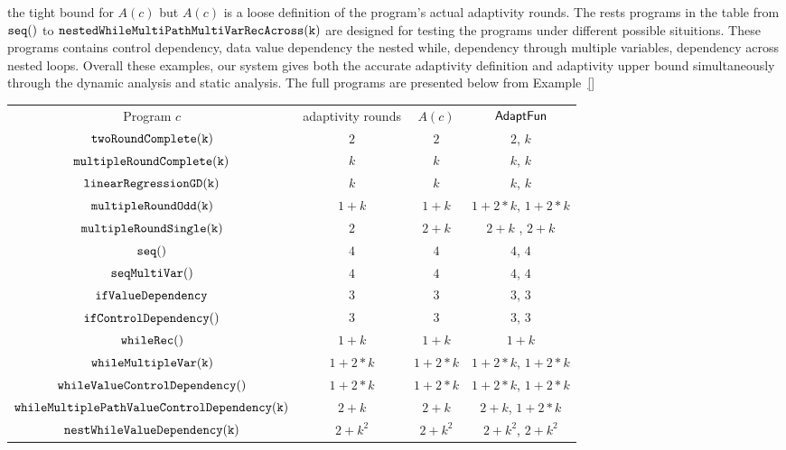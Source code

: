 the tight bound for $A(c)$ but $A(c)$ is a loose definition of the program's actual adaptivity rounds.
%
The rests programs in the table from  $\mathtt{seq()}$ to $ \mathtt{nestedWhileMultiPathMultiVarRecAcross(k)}$ are 
designed for testing the programs under different possible situitions.
These programs contains control dependency, data value dependency 
the nested while, dependency through multiple variables, dependency across nested loops. 
Overall these examples, our system gives both the accurate adaptivity definition and 
adaptivity upper bound simultaneously through the dynamic analysis and 
static analysis.
The full programs are presented below from Example~\ref{}
%
\begin{center}
{\footnotesize
        \begin{tabular}{ c c c c}
        \label{tb:imp}
         Program $c$ & adaptivity rounds & $A(c)$ & $\textsf{AdaptFun}$ \\ 
         $ \mathtt{twoRoundComplete(k)}$ & $2$ & $2$ & $2$, $k$ \\
         $ \mathtt{multipleRoundComplete(k)}$ & $k$ & $k$ & $k$, $k$  \\
         $ \mathtt{linearRegressionGD(k)}$ & $k$ & $k$ & $k$, $k$  \\
         $ \mathtt{multipleRoundOdd(k)}$ & $1 + k$ & $1 + k$ & $1 + 2*k$, $1 + 2*k$  \\
         $ \mathtt{multipleRoundSingle(k)}$ & $2$ & $2 + k$ & $2 + k$ , $2 + k$  \\
         $\mathtt{seq()}$ & $4$ & $4$ & $4$, $4$  \\ 
         $\mathtt{seqMultiVar()}$ & $4$ & $4$ & $4$, $4$ \\  
         $ \mathtt{ifValueDependency}$ & $3$ & $3$ & $3$, $3$ \\
         $\mathtt{ifControlDependency()}$ & $3$ & $3$ & $3$, $3$  \\
         $ \mathtt{whileRec()}$ & $1+k$ & $1+k$ & $1+k$  \\
         $ \mathtt{whileMultipleVar(k)}$ & $1 + 2*k$ & $1 + 2*k$ & $1 + 2*k$, $1 + 2 * k$  \\
         $ \mathtt{whileValueControlDependency()}$ & $1 + 2*k$ & $1 + 2*k$ & $1 + 2 * k$, $1 + 2 * k$  \\
         $ \mathtt{whileMultiplePathValueControlDependency(k)}$ & $2 + k$ & $2 + k$  & $2 + k$, $1 + 2 * k$   \\
         $ \mathtt{nestWhileValueDependency(k)}$ & $2 + k^2$ & $2 + k^2$  & $2 + k^2$, $2 + k^2$   \\

\end{tabular}}
\end{center}

